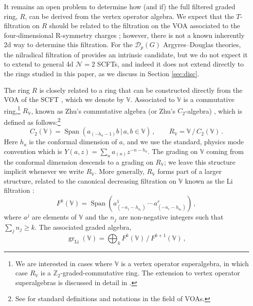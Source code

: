 \documentclass[12pt]{article}
\numberwithin{equation}{section}
\numberwithin{figure}{section}
\theoremstyle{plain}
\theoremstyle{definition}
\begin{document}
It remains an open problem to determine how (and if) the full filtered graded ring, $R$, can be derived from the vertex operator algebra. We expect that the $T$-filtration on $R$ should be related to the filtration on the VOA associated to the four-dimensional R-symmetry charges \cite{Song:2016yfd,Beem:2019tfp,ArabiArdehali:2025fad,Beem:2026lkq}; however, there is not a known inherently 2d way to determine this filtration. For the $\mathcal{D}_p(G)$ Argyres--Douglas theories, the nilradical filtration of \cite{Kang:2026ney} provides an intrinsic candidate, but we do not expect it to extend to general 4d $\mathcal{N}=2$ SCFTs, and indeed it does not extend directly to the rings studied in this paper, as we discuss in Section \ref{sec:disc}.

The ring $R$ is closely related to a ring that can be constructed directly from the VOA of the SCFT \cite{Beem:2013sza}, which we denote by $\mathbb{V}$. Associated to $\mathbb{V}$ is a commutative ring,\footnote{We are interested in cases where $\mathbb{V}$ is a vertex operator superalgebra, in which case $R_\mathbb{V}$ is a $\mathbb{Z}_2$-graded-commutative ring. The extension to vertex operator superalgebras is discussed in detail in \cite{MR4340951}.} $R_\mathbb{V}$, known as Zhu's commutative algebra (or Zhu's $C_2$-algebra) \cite{MR1317233}, which is defined as follows:\footnote{See \cite{AM} for standard definitions and notations in the field of VOAs.}
\begin{equation}
    C_2(\mathbb{V}) = \operatorname{Span}\left( a_{(-h_a-1)}b \, | \, a, b \in \mathbb{V} \right) \,, \qquad R_\mathbb{V} = \mathbb{V} \, / \, C_2(\mathbb{V}) \,.
\end{equation}
Here $h_a$ is the conformal dimension of $a$, and we use the standard, physics mode convention which is $Y(a, z) = \sum_n a_{(n)} z^{-n-h_a}$. The grading on $\mathbb{V}$ coming from the conformal dimension descends to a grading on $R_\mathbb{V}$; we leave this structure implicit whenever we write $R_\mathbb{V}$. More generally, $R_{\mathbb{V}}$ forms part of a larger structure, related to the canonical decreasing filtration on $\mathbb{V}$ known as the Li filtration \cite{MR2172688}:
\begin{equation}
    F^k(\mathbb{V}) = \operatorname{Span}\left( a_{(-n_1-h_{a_1})}^1 \, \cdots \, a_{(-n_r-h_{a_r})}^r \right) \,,
\end{equation}
where $a^j$ are elements of $\mathbb{V}$ and the $n_j$ are non-negative integers such that $\sum_j n_j \geq k$. The associated graded algebra,
\begin{equation}
    \operatorname{gr}_{\operatorname{Li}}(\mathbb{V}) = \bigoplus_k F^k(\mathbb{V}) \, / \, F^{k+1}(\mathbb{V}) \,,
\end{equation}
\end{document}

